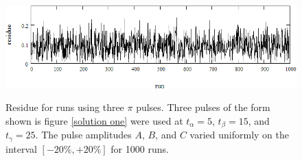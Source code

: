 \begin{figure}
\includegraphics[width=6.00in]
{three_pi/three_pi.png}\\
\caption[Residue for runs using three $\pi$ pulses]{Residue for runs using three $\pi$ pulses. Three pulses of the form shown is figure \ref{solution one} were used at $t_\alpha=5$, $t_\beta=15$, and $t_\gamma=25$. The pulse amplitudes $A$, $B$, and $C$ varied uniformly on the interval $[-20\%,+20\%]$ for 1000 runs.}
\label{three pi}
\end{figure} 
%
